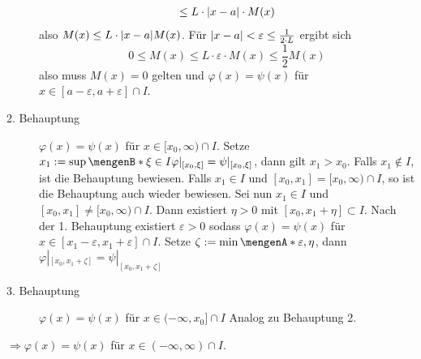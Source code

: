 \begin{description}
\begin{align*}
		\le L \cdot \lvert x-a\rvert \cdot M(x) 
	\end{align*}
	also $M(x) \le L \cdot \lvert x-a\rvert M(x) $. Für $\lvert x-a\rvert < \varepsilon\le \frac{1}{2 \cdot L} $ ergibt sich 
	\[
		0 \le M(x) \le L \cdot \varepsilon \cdot M(x) \le \frac{1}{2} M(x)
	\]
	also muss $M(x)=0$ gelten und $\varphi(x)= \psi(x)$ für $x \in [a-\varepsilon, a + \varepsilon] \cap I$.
	\item[2. Behauptung] $\varphi(x) = \psi(x)$ für $x \in [x_0,\infty) \cap I$.
	Setze $x_1 := \sup \set[\xi \in I]{\varphi|_{[x_0, \xi]} = \psi|_{[x_0, \xi]}} $, 
	dann gilt $x_1 > x_0$. Falls $x_1 \not\in I$, ist die Behauptung bewiesen. Falls
	$x_1 \in I$ und $[x_0, x_1]= [x_0, \infty) \cap I$, so ist die Behauptung auch wieder bewiesen. Sei nun $x_1 \in I$ und $[x_0, x_1] \not= [x_0, \infty) \cap I$. Dann 
	existiert $\eta >0$ mit $[x_0, x_1+ \eta] \subset I$. Nach der 1. Behauptung existiert $\varepsilon >0$ sodass $\varphi(x)=\psi(x)$ für 
	$x \in [x_1 -\varepsilon, x_1 + \varepsilon	] \cap I$. Setze $\zeta := \min \set{\varepsilon, \eta} $, dann $\varphi|_{[x_0, x_1 + \zeta]} = \psi|_{[x_0, x_1+ \zeta]}$
	\light
	\item[3. Behauptung] $\varphi(x) = \psi(x)$ für $x \in (- \infty, x_0] \cap I$
	Analog zu Behauptung 2.
\end{description}
$\Rightarrow \varphi(x)= \psi(x)$ für $x \in (- \infty, \infty) \cap I$. \bewende 


